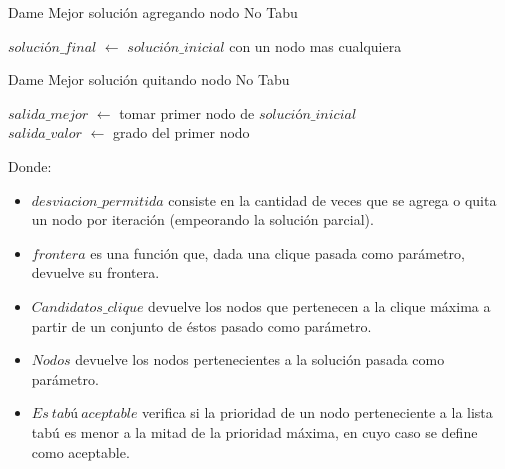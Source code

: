 \begin{algorithm}[H]
    \SetAlgoLined
    \caption{Dame Mejor solución agregando nodo No Tabu}

	$solución\_final$ $\leftarrow$ $solución\_inicial$ con un nodo mas cualquiera \\

\end{algorithm}

\begin{algorithm}[H]
    \SetAlgoLined
    \caption{Dame Mejor solución quitando nodo No Tabu}

	$salida\_mejor$ $\leftarrow$ tomar primer nodo de $solución\_inicial$ \\
	$salida\_valor$ $\leftarrow$ grado del primer nodo \\

\end{algorithm}

Donde:
\begin{itemize}
 \item $desviacion\_permitida$ consiste en la cantidad de veces que se agrega o quita un nodo por iteración (empeorando la solución parcial).
 \item $frontera$ es una función que, dada una clique pasada como parámetro, devuelve su frontera.
 \item $Candidatos\_clique$ devuelve los nodos que pertenecen a la clique máxima a partir de un conjunto de éstos pasado como parámetro.
 \item $Nodos$ devuelve los nodos pertenecientes a la solución pasada como parámetro.
 \item $Es\ tabú\ aceptable$ verifica si la prioridad de un nodo perteneciente a la lista tabú es menor a la mitad de la prioridad máxima, en cuyo caso se define como aceptable.
\end{itemize}

